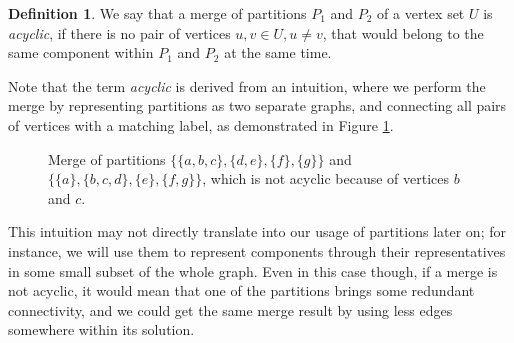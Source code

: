 \documentclass[thesis=M,english,hidelinks]{FITthesis}[2012/10/20]
\theoremstyle{definition}
\newtheorem{definition}{Definition}
\begin{document}
\begin{definition}
    We say that a merge of partitions $P_1$ and $P_2$ of a vertex set $U$ is \emph{acyclic}, if there is no pair of
    vertices $u, v \in U, u \neq v$, that would belong to the same component within $P_1$ and $P_2$ at the same time.
\end{definition}

Note that the term \emph{acyclic} is derived from an intuition, where we perform the merge by representing partitions as
two separate graphs, and connecting all pairs of vertices with a matching label, as demonstrated in Figure
\ref{fig:cyclicmerge}.

\begin{figure}
    \centering
    \caption{Merge of partitions $\{\{a, b, c\}, \{d, e\}, \{f\}, \{g\}\}$ and
    $\{\{a\}, \{b, c, d\}, \allowbreak \{e\}, \{f, g\}\}$, which is not acyclic because of vertices $b$ and $c$.}
    \label{fig:cyclicmerge}
\end{figure}

This intuition may not directly translate into our usage of partitions later on; for instance, we will use them to
represent components through their representatives in some small subset of the whole graph. Even in this case though, if
a merge is not acyclic, it would mean that one of the partitions brings some redundant connectivity, and we could get
the same merge result by using less edges somewhere within its solution.
\end{document}
